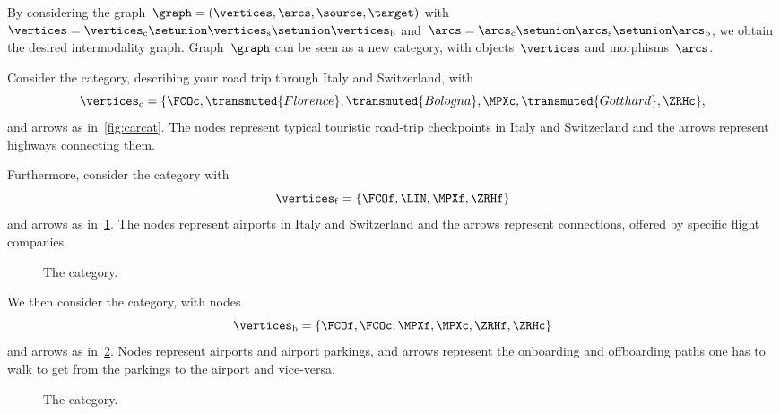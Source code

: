 By considering the graph~$\graph=(\vertices,\arcs,\source,\target)$ with~$\vertices=\vertices_\mathrm{c}\setunion \vertices_\mathrm{s}\setunion \vertices_\mathrm{b}$ and~$\arcs=\arcs_\mathrm{c}\setunion \arcs_\mathrm{s}\setunion \arcs_\mathrm{b}$, we obtain the desired intermodality graph.
Graph~$\graph$ can be seen as a new category, with objects~$\vertices$ and morphisms~$\arcs$.
\begin{example}
	\label{exa:car-category}
	Consider the \Car category, describing your road trip through Italy and Switzerland, with
	\begin{equation*}
		\vertices_{\mathrm{c}}=
		\{
		\FCOc,
		\transmuted{Florence},
		\transmuted{Bologna},
		\MPXc,
		\transmuted{Gotthard},
		\ZRHc
		\},
	\end{equation*}
	and arrows as in~\cref{fig:carcat}.
	The nodes represent typical touristic road-trip checkpoints in Italy and Switzerland and the arrows represent highways connecting them.

	\begin{figure*}[h!]
		\caption{The \Car category.}
		\label{fig:carcat}
	\end{figure*}

	Furthermore, consider the \Flight category with
	\begin{equation}
		\vertices_\mathrm{f}
		= \{
		\FCOf,
		\LIN,
		\MPXf,
		\ZRHf
		\}
	\end{equation}
	and arrows as in~\cref{fig:flight}.
	The nodes represent airports in Italy and Switzerland and the arrows represent connections, offered by specific flight companies.

	\begin{figure}[h!]
		\centering
		\caption{The \Flight category.}
		\label{fig:flight}
	\end{figure}

	We then consider the \Board category, with nodes
	\begin{equation*}
		\vertices_\mathrm{b}=\{\FCOf,\FCOc,\MPXf,\MPXc,\ZRHf,\ZRHc\}
	\end{equation*}
	and arrows as in~\cref{fig:boarding}.
	Nodes represent airports and airport parkings, and arrows represent the onboarding and offboarding paths one has to walk to get from the parkings to the airport and vice-versa.

	\begin{figure}[h!]
		\centering
		\caption{The \Board category. }
		\label{fig:boarding}
	\end{figure}


\end{example}
